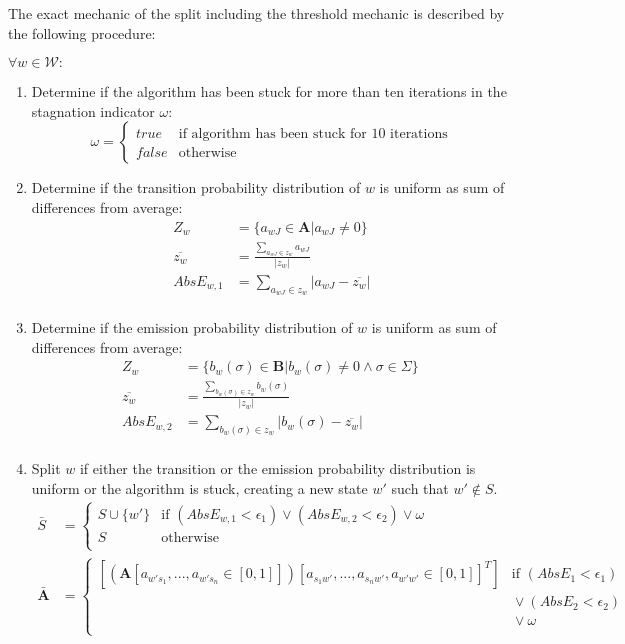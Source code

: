 The exact mechanic of the split including the threshold mechanic is described by the following procedure:

$\forall w\in\mathcal{W}:$
\begin{enumerate}
	\item Determine if the algorithm has been stuck for more than ten iterations in the stagnation indicator $\omega$:
	$$ \omega = \begin{cases}
true &\text{if algorithm has been stuck for 10 iterations} \\
false &\text{otherwise}
\end{cases} $$
\item Determine if the transition probability distribution of $w$ is uniform as sum of differences from average:
\begin{align*}
Z_w &= \{a_{wJ} \in \mathbf{A} \vert a_{wJ} \neq 0\} \\
\overline{z_w} &= \frac{\sum_{a_{wJ} \in z_w} a_{wJ}}{\vert z_w \vert} \\
AbsE_{w,1} &= \sum_{a_{wJ} \in z_w} \vert a_{wJ} - \overline{z_w} \vert \\
\end{align*}
\item Determine if the emission probability distribution of $w$ is uniform as sum of differences from average:
\begin{align*}
Z_w &= \{b_{w}(\sigma) \in \mathbf{B} \vert b_{w}(\sigma) \neq 0 \wedge \sigma \in \Sigma\} \ \\
\overline{z_w} &= \frac{\sum_{b_{w}(\sigma) \in z_w} b_{w}(\sigma)}{\vert z_w \vert} \\
AbsE_{w,2} &= \sum_{b_{w}(\sigma) \in z_w} \vert b_{w}(\sigma) - \overline{z_w} \vert \\
\end{align*}
\item Split $w$ if either the transition or the emission probability distribution is uniform or the algorithm is stuck, creating a new state $w'$ such that $w'\notin S$.
\begin{align*}
\bar{S} &= \begin{cases}
S \cup \{ w' \} &\text{if } (AbsE_{w,1} < \epsilon_1) \vee (AbsE_{w,2} < \epsilon_2) \vee \omega\\
S &\text{otherwise} \\
\end{cases} \\
\mathbf{\bar{A}} &= \begin{cases}
[(\mathbf{A} [a_{w's_1},  ... , a_{w's_n} \in [0,1]])[a_{s_1w'},  ... , a_{s_nw'}, a_{w'w'} \in [0, 1]]^T] &\text{if } (AbsE_1 < \epsilon_1)\\&\text{}\vee (AbsE_2 < \epsilon_2)\\&\text{}\vee \omega\\

\end{cases}
\end{align*}
\end{enumerate}
